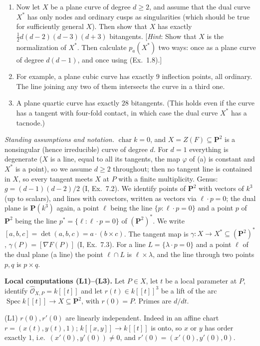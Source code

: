 \documentclass[11pt]{article}
\begin{document}
{\begin{enumerate}[label=(\alph*),leftmargin=*]
\item Now let $X$ be a plane curve of degree $d\ge2$, and assume that the dual curve $X^*$ has only nodes and ordinary cusps as singularities (which should be true for sufficiently general $X$). Then show that $X$ has exactly $\frac12d(d-2)(d-3)(d+3)$ bitangents. [\emph{Hint}: Show that $X$ is the normalization of $X^*$. Then calculate $p_a(X^*)$ two ways: once as a plane curve of degree $d(d-1)$, and once using (Ex.~1.8).]
\item For example, a plane cubic curve has exactly $9$ inflection points, all ordinary. The line joining any two of them intersects the curve in a third one.
\item A plane quartic curve has exactly $28$ bitangents. (This holds even if the curve has a tangent with four-fold contact, in which case the dual curve $X^*$ has a tacnode.)
\end{enumerate}}
\pf
\emph{Standing assumptions and notation.} $\operatorname{char}k=0$, and $X=Z(F)\subseteq\mathbf P^2$ is a nonsingular (hence irreducible) curve of degree $d$. For $d=1$ everything is degenerate ($X$ is a line, equal to all its tangents, the map $\varphi$ of (a) is constant and $X^*$ is a point), so we assume $d\ge2$ throughout; then no tangent line is contained in $X$, so every tangent meets $X$ at $P$ with a finite multiplicity. Genus: $g=(d-1)(d-2)/2$ (I, Ex.~7.2). We identify points of $\mathbf P^2$ with vectors of $k^3$ (up to scalars), and lines with covectors, written as vectors via $\ell\cdot p=0$; the dual plane is $\mathbf P(k^3)$ again, a point $\ell$ being the line $\{p:\ell\cdot p=0\}$ and a point $p$ of $\mathbf P^2$ being the line $p^*=\{\ell:\ell\cdot p=0\}$ of $(\mathbf P^2)^*$. We write $[a,b,c]=\det(a,b,c)=a\cdot(b\times c)$. The tangent map is $\gamma:X\to X^*\subseteq(\mathbf P^2)^*$, $\gamma(P)=[\nabla F(P)]$ (I, Ex.~7.3). For a line $L=\{\lambda\cdot p=0\}$ and a point $\ell$ of the dual plane (a line) the point $\ell\cap L$ is $\ell\times\lambda$, and the line through two points $p,q$ is $p\times q$.

\textbf{Local computations (L1)--(L3).} Let $P\in X$, let $t$ be a local parameter at $P$, identify $\widehat{\mathcal O}_{X,P}=k[[t]]$ and let $r(t)\in k[[t]]^3$ be a lift of the arc $\operatorname{Spec}k[[t]]\to X\subseteq\mathbf P^2$, with $r(0)=P$. Primes are $d/dt$.

(L1) $r(0),r'(0)$ are linearly independent. Indeed in an affine chart $r=(x(t),y(t),1)$; $k[[x,y]]\to k[[t]]$ is onto, so $x$ or $y$ has order exactly $1$, i.e.\ $(x'(0),y'(0))\neq0$, and $r'(0)=(x'(0),y'(0),0)$.
\end{document}

